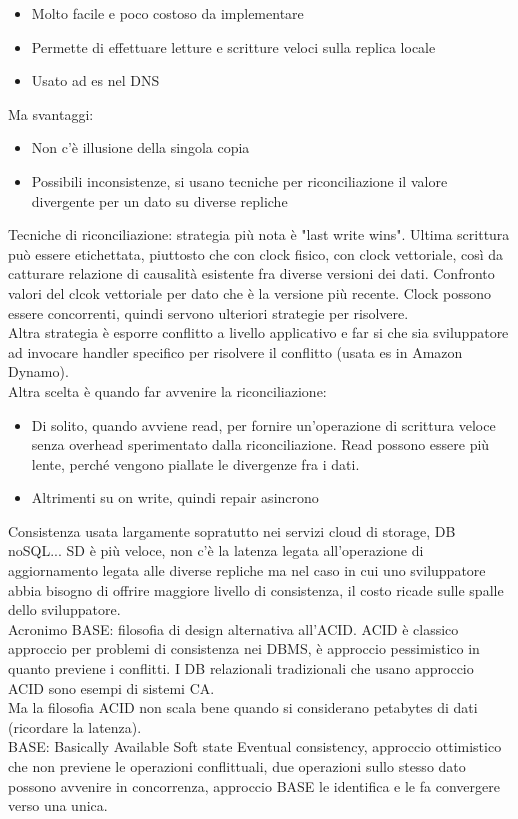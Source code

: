\documentclass[16px]{article}
\begin{document}
\begin{itemize}
\item Molto facile e poco costoso da implementare
\item Permette di effettuare letture e scritture veloci sulla replica locale
\item Usato ad es nel DNS
\end{itemize}
Ma svantaggi:
\begin{itemize}
\item Non c'è illusione della singola copia
\item Possibili inconsistenze, si usano tecniche per riconciliazione il valore divergente per un dato su diverse repliche
\end{itemize}
Tecniche di riconciliazione: strategia più nota è "last write wins". Ultima scrittura può essere etichettata, piuttosto che con clock fisico, con clock vettoriale, così da catturare relazione di causalità esistente fra diverse versioni dei dati. Confronto valori del clcok vettoriale per dato che è la versione più recente. Clock possono essere concorrenti, quindi servono ulteriori strategie per risolvere.\\ Altra strategia è esporre conflitto a livello applicativo e far si che sia sviluppatore ad invocare handler specifico per risolvere il conflitto (usata es in Amazon Dynamo).\\ Altra scelta è quando far avvenire la riconciliazione:
\begin{itemize}
\item Di solito, quando avviene read, per fornire un'operazione di scrittura veloce senza overhead sperimentato dalla riconciliazione. Read possono essere più lente, perché vengono piallate le divergenze fra i dati.
\item Altrimenti su on write, quindi repair asincrono
\end{itemize}
Consistenza usata largamente sopratutto nei servizi cloud di storage, DB noSQL... SD è più veloce, non c'è la latenza legata all'operazione di aggiornamento legata alle diverse repliche ma nel caso in cui uno sviluppatore abbia bisogno di offrire maggiore livello di consistenza, il costo ricade sulle spalle dello sviluppatore.\\ Acronimo BASE: filosofia di design alternativa all'ACID. ACID è classico approccio  per problemi di consistenza nei DBMS, è approccio pessimistico in quanto previene i conflitti. I DB relazionali tradizionali che usano approccio ACID sono esempi di sistemi CA.\\ Ma la filosofia ACID non scala bene quando si considerano petabytes di dati (ricordare la latenza).\\ BASE: Basically Available Soft state Eventual consistency, approccio ottimistico che non previene le operazioni conflittuali, due operazioni sullo stesso dato possono avvenire in concorrenza, approccio BASE le identifica e le fa convergere verso una unica.\\
\end{document}
